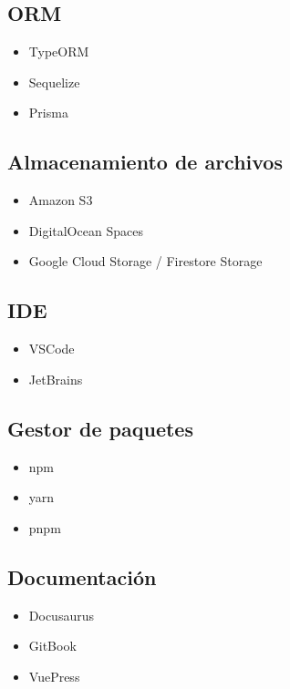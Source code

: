 
\subsection{ORM}
\begin{itemize}
    \item TypeORM
    \item Sequelize
    \item Prisma
\end{itemize}

\subsection{Almacenamiento de archivos}
\begin{itemize}
    \item Amazon S3
    \item DigitalOcean Spaces
    \item Google Cloud Storage / Firestore Storage
\end{itemize}

\subsection{IDE}
\begin{itemize}
    \item VSCode
    \item JetBrains
\end{itemize}

\subsection{Gestor de paquetes}
\begin{itemize}
    \item npm
    \item yarn
    \item pnpm
\end{itemize}

\subsection{Documentación}
\begin{itemize}
    \item Docusaurus
    \item GitBook
    \item VuePress
\end{itemize}


